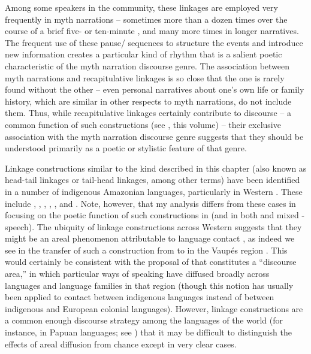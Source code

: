 \documentclass[output=paper]{LSP/langsci}
\begin{document}
Among some speakers in the community, these linkages are employed very frequently in myth narrations – sometimes more than a dozen times over the course of a brief five- or ten-minute , and many more times in longer narratives. The frequent use of these pause/ sequences to structure the events and introduce new information creates a particular kind of  rhythm that is a salient poetic characteristic of the myth narration discourse genre. The association between myth narrations and recapitulative linkages is so close that the one is rarely found without the other – even personal narratives about one’s own life or family history, which are similar in other respects to myth narrations, do not include them. Thus, while recapitulative linkages certainly contribute to discourse  – a common function of such constructions (see \citeauthor{guerin18}, this volume) – their exclusive association with the myth narration discourse genre suggests that they should be understood primarily as a poetic or stylistic feature of that genre.

Linkage constructions similar to the kind described in this chapter (also known as head-tail linkages or tail-head linkages, among other terms) have been identified in a number of indigenous Amazonian languages, particularly in Western . These include  \citep{Guillaume2011},  \citep[][169--171]{aikhenvald02},  \citep{vangijn14},  \citep{overall14},  \citep[][515--522]{kasia17}, and  \citep[][598--599]{vuill12}. Note, however, that my analysis differs from these cases in focusing on the poetic function of such constructions in  (and in both  and mixed - speech). The ubiquity of linkage constructions across Western  suggests that they might be an areal phenomenon attributable to language contact \citep[][916]{seifart10}, as indeed we see in the transfer of such a construction from  to  in the Vaupés region \citep[][169--171]{aikhenvald02}. This would certainly be consistent with the proposal of \citet{beieretal.2002} that  constitutes a ``discourse area,'' in which particular ways of speaking have diffused broadly across languages and language families in that region (though this notion has usually been applied to contact between indigenous languages instead of between indigenous and European colonial languages). However, linkage constructions are a common enough discourse strategy among the languages of the world (for instance, in Papuan languages; see \citealt{devries.2005}) that it may be difficult to distinguish the effects of areal diffusion from chance except in very clear cases.
\end{document}
